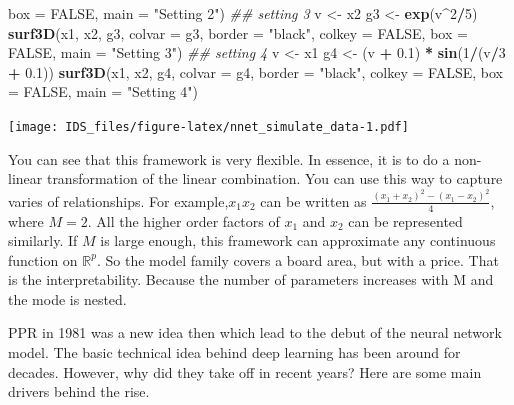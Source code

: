 \documentclass[12pt,]{krantz}
\makeatletter
\newenvironment{Shaded}{\begin{snugshade}}{\end{snugshade}}
\newcommand{\CommentTok}[1]{\textcolor[rgb]{0.37,0.37,0.37}{\textit{#1}}}
\newcommand{\DataTypeTok}[1]{\textcolor[rgb]{0.27,0.27,0.27}{#1}}
\newcommand{\DecValTok}[1]{\textcolor[rgb]{0.06,0.06,0.06}{#1}}
\newcommand{\FloatTok}[1]{\textcolor[rgb]{0.06,0.06,0.06}{#1}}
\newcommand{\KeywordTok}[1]{\textcolor[rgb]{0.27,0.27,0.27}{\textbf{#1}}}
\newcommand{\NormalTok}[1]{#1}
\newcommand{\OperatorTok}[1]{\textcolor[rgb]{0.43,0.43,0.43}{\textbf{#1}}}
\newcommand{\OtherTok}[1]{\textcolor[rgb]{0.37,0.37,0.37}{#1}}
\newcommand{\StringTok}[1]{\textcolor[rgb]{0.5,0.5,0.5}{#1}}
\newenvironment{kframe}{%
\medskip{}
\setlength{\fboxsep}{.8em}
 \def\at@end@of@kframe{}%
 \ifinner\ifhmode%
  \def\at@end@of@kframe{\end{minipage}}%
  \begin{minipage}{\columnwidth}%
 \fi\fi%
 \def\FrameCommand##1{\hskip\@totalleftmargin \hskip-\fboxsep
 \colorbox{shadecolor}{##1}\hskip-\fboxsep
     \hskip-\linewidth \hskip-\@totalleftmargin \hskip\columnwidth}%
 \MakeFramed {\advance\hsize-\width
   \@totalleftmargin\z@ \linewidth\hsize
   \@setminipage}}%
 {\par\unskip\endMakeFramed%
 \at@end@of@kframe}
\renewenvironment{Shaded}{\begin{kframe}}{\end{kframe}}
\makeatother
\begin{document}
\begin{Shaded}
\begin{Highlighting}[]
    \DataTypeTok{box =} \OtherTok{FALSE}\NormalTok{, }\DataTypeTok{main =} \StringTok{"Setting 2"}\NormalTok{)}
\CommentTok{## setting 3}
\NormalTok{v <-}\StringTok{ }\NormalTok{x2}
\NormalTok{g3 <-}\StringTok{ }\KeywordTok{exp}\NormalTok{(v}\OperatorTok{^}\DecValTok{2}\OperatorTok{/}\DecValTok{5}\NormalTok{)}
\KeywordTok{surf3D}\NormalTok{(x1, x2, g3, }\DataTypeTok{colvar =}\NormalTok{ g3, }\DataTypeTok{border =} \StringTok{"black"}\NormalTok{, }\DataTypeTok{colkey =} \OtherTok{FALSE}\NormalTok{, }
    \DataTypeTok{box =} \OtherTok{FALSE}\NormalTok{, }\DataTypeTok{main =} \StringTok{"Setting 3"}\NormalTok{)}
\CommentTok{## setting 4}
\NormalTok{v <-}\StringTok{ }\NormalTok{x1}
\NormalTok{g4 <-}\StringTok{ }\NormalTok{(v }\OperatorTok{+}\StringTok{ }\FloatTok{0.1}\NormalTok{) }\OperatorTok{*}\StringTok{ }\KeywordTok{sin}\NormalTok{(}\DecValTok{1}\OperatorTok{/}\NormalTok{(v}\OperatorTok{/}\DecValTok{3} \OperatorTok{+}\StringTok{ }\FloatTok{0.1}\NormalTok{))}
\KeywordTok{surf3D}\NormalTok{(x1, x2, g4, }\DataTypeTok{colvar =}\NormalTok{ g4, }\DataTypeTok{border =} \StringTok{"black"}\NormalTok{, }\DataTypeTok{colkey =} \OtherTok{FALSE}\NormalTok{, }
    \DataTypeTok{box =} \OtherTok{FALSE}\NormalTok{, }\DataTypeTok{main =} \StringTok{"Setting 4"}\NormalTok{)}
\end{Highlighting}
\end{Shaded}

\texttt{[image: IDS\_files/figure-latex/nnet\_simulate\_data-1.pdf]}

You can see that this framework is very flexible. In essence, it is to do a non-linear transformation of the linear combination. You can use this way to capture varies of relationships. For example,\(x_{1}x_{2}\) can be written as \(\frac{(x_{1}+x_{2})^{2}-(x_{1}-x_{2})^{2}}{4}\), where \(M=2\). All the higher order factors of \(x_1\) and \(x_2\) can be represented similarly. If \(M\) is large enough, this framework can approximate any continuous function on \(\mathbb{R}^{p}\). So the model family covers a board area, but with a price. That is the interpretability. Because the number of parameters increases with M and the mode is nested.

PPR in 1981 was a new idea then which lead to the debut of the neural network model. The basic technical idea behind deep learning has been around for decades. However, why did they take off in recent years? Here are some main drivers behind the rise.
\end{document}
